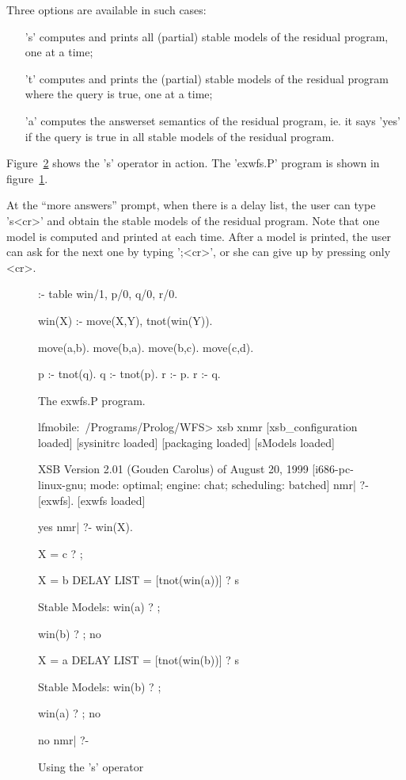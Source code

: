 \documentclass{article}
\begin{document}
Three options are available in such cases: 

\begin{enumerate}

\item['s'] computes and prints all (partial) stable models of the residual
  program, one at a time;

\item['t'] computes and prints the (partial) stable models of the residual
  program where the query is true, one at a time;

\item['a'] computes the answerset semantics of the residual program,
  ie. it says 'yes' if the query is true in all stable models of the
  residual program.

\end{enumerate}

Figure~\ref{fig:stable} shows the 's' operator in action. The
'exwfs.P' program is shown in figure~\ref{fig:exwfs}. 

At the ``more answers'' prompt, when there is a delay list, the user
can type 's<cr>' and obtain the stable models of the residual program.
Note that one model is computed and printed at each time. After a
model is printed, the user can ask for the next one by typing ';<cr>',
or she can give up by pressing only <cr>.

\begin{figure}
\label{fig:exwfs}
\centering
\scriptsize
\begin{boxedverbatim}
:- table win/1, p/0, q/0, r/0.

win(X) :- move(X,Y), tnot(win(Y)).

move(a,b).
move(b,a).
move(b,c).
move(c,d).

p :- tnot(q).
q :- tnot(p).
r :- p.
r :- q.
\end{boxedverbatim}
\caption{The exwfs.P program.}
\end{figure}

\begin{figure}
\label{fig:stable}
\centering
\scriptsize
\begin{boxedverbatim}
lfmobile:~/Programs/Prolog/WFS> xsb xnmr
[xsb_configuration loaded]
[sysinitrc loaded]
[packaging loaded]
[sModels loaded]

XSB Version 2.01 (Gouden Carolus) of August 20, 1999
[i686-pc-linux-gnu; mode: optimal; engine: chat; scheduling: batched]
nmr| ?- [exwfs].
[exwfs loaded]

yes
nmr| ?- win(X).

X = c ? ;

X = b
DELAY LIST = [tnot(win(a))] ? s

Stable Models: 
  {win(a)} ? ;

  {win(b)} ? ;
  no

X = a
DELAY LIST = [tnot(win(b))] ? s

Stable Models: 
  {win(b)} ? ;

  {win(a)} ? ;
  no

no
nmr| ?- 
\end{boxedverbatim}
\caption{Using the 's' operator}
\end{figure}
\end{document}
